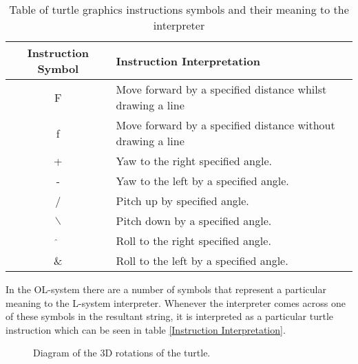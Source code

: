 \begin{table}[h!]
\centering
\begin{tabular}{ | c | l | }
\hline
	Instruction Symbol 	& Instruction Interpretation \\  
\hline
\hline
	F 					& Move forward by a specified distance whilst drawing a line\\
\hline
	f 					& Move forward by a specified distance without drawing a line\\
\hline
	+ 					& Yaw to the right specified angle.\\
\hline
	- 					& Yaw to the left by a specified angle.\\
\hline
	/ 					& Pitch up by specified angle. \\
\hline
	$\backslash$ 		& Pitch down by a specified angle.\\
\hline
	$\hat{}$ 			& Roll to the right specified angle.\\
\hline
	\& 					& Roll to the left by a specified angle.\\
\hline
\end{tabular}
\caption{Table of turtle graphics instructions symbols and their meaning to the interpreter}
\label{DOL-system instructions}
\end{table}
\FloatBarrier

\noindent
In the OL-system there are a number of symbols that represent a particular meaning to the L-system interpreter. Whenever the interpreter comes across one of these symbols in the resultant string, it is interpreted as a particular turtle instruction which can be seen in table \ref{Instruction Interpretation}. 

\begin{figure}[htbp]
	{\centering
		\setlength{\fboxrule}{1pt}
		\vspace{7px}
		\caption{Diagram of the 3D rotations of the turtle.} \label{3D turtle rotations}
	}
\end{figure}
\FloatBarrier

